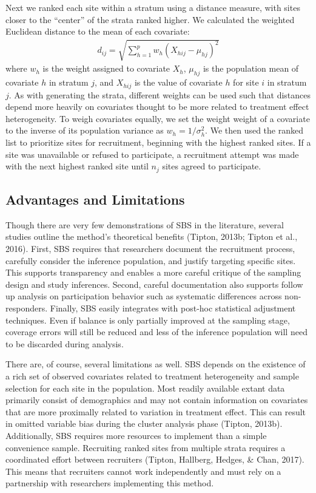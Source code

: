 \documentclass[man,floatsintext]{apa6}
\begin{document}
Next we ranked each site within a stratum using a distance measure, with sites closer to the \enquote{center} of the strata ranked higher. We calculated the weighted Euclidean distance to the mean of each covariate:
\begin{align} \label{eq:euclid}
d_{ij} = \sqrt{\sum^p_{h=1}w_h(X_{hij} - \mu_{hj})^2}
\end{align}
where \(w_h\) is the weight assigned to covariate \(X_h\), \(\mu_{hj}\) is the population mean of covariate \(h\) in stratum \(j\), and \(X_{hij}\) is the value of covariate \(h\) for site \(i\) in stratum \(j\). As with generating the strata, different weights can be used such that distances depend more heavily on covariates thought to be more related to treatment effect heterogeneity. To weigh covariates equally, we set the weight weight of a covariate to the inverse of its population variance as \(w_h = 1/\sigma^2_h\). We then used the ranked list to prioritize sites for recruitment, beginning with the highest ranked sites. If a site was unavailable or refused to participate, a recruitment attempt was made with the next highest ranked site until \(n_j\) sites agreed to participate.

\hypertarget{advantages-and-limitations}{%
\subsection{Advantages and Limitations}\label{advantages-and-limitations}}

Though there are very few demonstrations of SBS in the literature, several studies outline the method's theoretical benefits (Tipton, 2013b; Tipton et al., 2016). First, SBS requires that researchers document the recruitment process, carefully consider the inference population, and justify targeting specific sites. This supports transparency and enables a more careful critique of the sampling design and study inferences. Second, careful documentation also supports follow up analysis on participation behavior such as systematic differences across non-responders. Finally, SBS easily integrates with post-hoc statistical adjustment techniques. Even if balance is only partially improved at the sampling stage, coverage errors will still be reduced and less of the inference population will need to be discarded during analysis.

There are, of course, several limitations as well. SBS depends on the existence of a rich set of observed covariates related to treatment heterogeneity and sample selection for each site in the population. Most readily available extant data primarily consist of demographics and may not contain information on covariates that are more proximally related to variation in treatment effect. This can result in omitted variable bias during the cluster analysis phase (Tipton, 2013b). Additionally, SBS requires more resources to implement than a simple convenience sample. Recruiting ranked sites from multiple strata requires a coordinated effort between recruiters (Tipton, Hallberg, Hedges, \& Chan, 2017). This means that recruiters cannot work independently and must rely on a partnership with researchers implementing this method.
\end{document}
